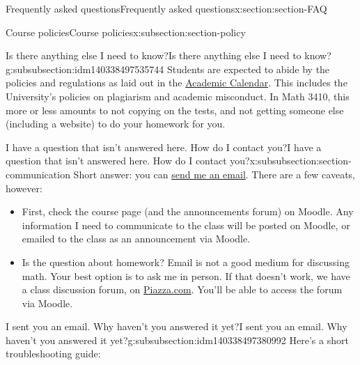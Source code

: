 \documentclass[oneside,10pt,]{article}
\begin{document}
\begin{sectionptx}{Frequently asked questions}{}{Frequently asked questions}{}{}{x:section:section-FAQ}
\begin{subsectionptx}{Course policies}{}{Course policies}{}{}{x:subsection:section-policy}
%
%
\typeout{************************************************}
\typeout{************************************************}
%
\begin{subsubsectionptx}{Is there anything else I need to know?}{}{Is there anything else I need to know?}{}{}{g:subsubsection:idm140338497535744}
Students are expected to abide by the policies and regulations as laid out in the \href{https://www.uleth.ca/ross/academic-calendar}{Academic Calendar}. This includes the University's policies on plagiarism and academic misconduct. In Math 3410, this more or less amounts to not copying on the tests, and not getting someone else (including a website) to do your homework for you.%
\end{subsubsectionptx}
%
%
\typeout{************************************************}
\typeout{************************************************}
%
\begin{subsubsectionptx}{I have a question that isn't answered here. How do I contact you?}{}{I have a question that isn't answered here. How do I contact you?}{}{}{x:subsubsection:section-communication}
Short answer: you can \href{mailto:sean.fitzpatrick@uleth.ca}{send me an email}. There are a few caveats, however:%
\begin{itemize}[label=\textbullet]
\item{}First, check the course page (and the announcements forum) on Moodle. Any information I need to communicate to the class will be posted on Moodle, or emailed to the class as an announcement via Moodle.%
\item{}Is the question about homework? Email is not a good medium for discussing math. Your best option is to ask me in person. If that doesn't work, we have a class discussion forum, on \href{https://piazza.com}{Piazza.com}. You'll be able to access the forum via Moodle.%
\end{itemize}
%
\end{subsubsectionptx}
%
%
\typeout{************************************************}
\typeout{************************************************}
%
\begin{subsubsectionptx}{I sent you an email. Why haven't you answered it yet?}{}{I sent you an email. Why haven't you answered it yet?}{}{}{g:subsubsection:idm140338497380992}
Here's a short troubleshooting guide:%

\end{subsubsectionptx}
\end{subsectionptx}
\end{sectionptx}
\end{document}
